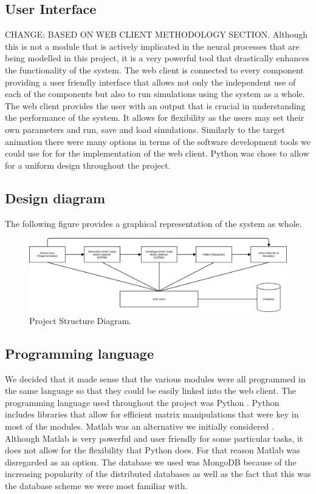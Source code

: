\documentclass[a4paper,11pt]{article}
\begin{document}
\subsection{User Interface}
CHANGE: BASED ON WEB CLIENT METHODOLOGY SECTION. 
Although this is not a module that is actively implicated in the neural processes that are being modelled in this project, it is a very powerful tool that drastically enhances the functionality of the system. The web client is connected to every component providing a user friendly interface that allows not only the independent use of each of the components but also to run simulations using the system as a whole. The web client provides the user with an output that is crucial in understanding the performance of the system. It allows for flexibility as the users may set their own parameters and run, save and load simulations. Similarly to the target animation there were many options in terms of the software development tools we could use for for the implementation of the web client. Python was chose to allow for a uniform design throughout the project.

\subsection{Design diagram}
The following figure provides a graphical representation of the system as whole. 

\begin{figure}[hb]
\centering
\includegraphics[scale = 0.35]{designblockdiagram2}
\caption{Project Structure Diagram.}
\end{figure}

\subsection{Programming language}
We decided that it made sense that the various modules were all programmed in the same language so that they could be easily linked into the web client. The programming language used throughout the project was Python \cite{python}. Python includes libraries that allow for efficient matrix manipulations that were key in most of the modules. Matlab was an alternative we initially considered \cite{matlab}. Although Matlab is very powerful and user friendly for some particular tasks, it does not allow for the flexibility that Python does. For that reason Matlab was disregarded as an option.
The database we used was MongoDB because of the increasing popularity of the distributed databases as well as the fact that this was the database scheme we were most familiar with.
\end{document}
